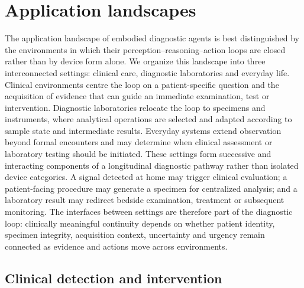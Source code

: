 \documentclass[12pt,a4paper]{article}
\begin{document}
\section{Application landscapes}
\label{sec:application_landscapes}

%
The application landscape of embodied diagnostic agents is best distinguished by the environments in which their perception--reasoning--action loops are closed rather than by device form alone. We organize this landscape into three interconnected settings: clinical care, diagnostic laboratories and everyday life. Clinical environments centre the loop on a patient-specific question and the acquisition of evidence that can guide an immediate examination, test or intervention. Diagnostic laboratories relocate the loop to specimens and instruments, where analytical operations are selected and adapted according to sample state and intermediate results. Everyday systems extend observation beyond formal encounters and may determine when clinical assessment or laboratory testing should be initiated. These settings form successive and interacting components of a longitudinal diagnostic pathway rather than isolated device categories. A signal detected at home may trigger clinical evaluation; a patient-facing procedure may generate a specimen for centralized analysis; and a laboratory result may redirect bedside examination, treatment or subsequent monitoring. The interfaces between settings are therefore part of the diagnostic loop: clinically meaningful continuity depends on whether patient identity, specimen integrity, acquisition context, uncertainty and urgency remain connected as evidence and actions move across environments.


\subsection{Clinical detection and intervention}
\label{subsec:clinical_detection_intervention}
\end{document}
